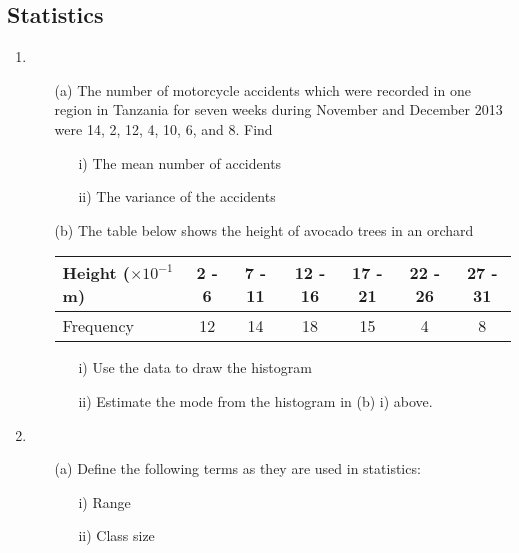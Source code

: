 \subsection{Statistics}

\begin{enumerate}
	\item 
	\begin{enumerate}[topsep=0ex,itemsep=0ex,partopsep=1ex,parsep=1ex]
		\item[(a)] The number of motorcycle accidents which were recorded in one region in Tanzania for seven weeks during November and December 2013 were 14, 2, 12, 4, 10, 6, and 8. Find
		\begin{enumerate}[topsep=0ex,itemsep=0ex,partopsep=1ex,parsep=1ex]
			\item[i)] The mean number of accidents
			\item[ii)] The variance of the accidents
		\end{enumerate}
		
		\item[(b)] The table below shows the height of avocado trees in an orchard
		\begin{center}
			\begin{tabular}{|l|c|c|c|c|c|c|} \hline
				Height ($\times 10^{-1}$ m) & 2 - 6 & 7 - 11 & 12 - 16 & 17 - 21 & 22 - 26 & 27 - 31 \\ \hline
				Frequency & 12 & 14 & 18 & 15 & 4 & 8 \\ \hline
			\end{tabular}
		\end{center}
		\begin{enumerate}[topsep=0ex,itemsep=0ex,partopsep=1ex,parsep=1ex]
			\item[i)] Use the data to draw the histogram
			\item[ii)] Estimate the mode from the histogram in (b) i) above. 
		\end{enumerate}
	\end{enumerate}

	\item
	\begin{enumerate}[topsep=0ex,itemsep=0ex,partopsep=1ex,parsep=1ex]
		\item[(a)] Define the following terms as they are used in statistics:
		\begin{enumerate}[topsep=0ex,itemsep=0ex,partopsep=1ex,parsep=1ex]
			\item[i)] Range
			\item[ii)] Class size
		\end{enumerate}
		

\end{enumerate}
\end{enumerate}
